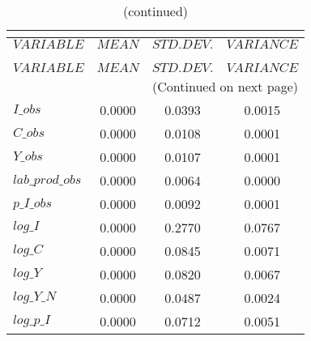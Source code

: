  
\begin{center}
\begin{longtable}{lccc} 
\caption{THEORETICAL MOMENTS}\\
 \label{Table:th_moments}\\
\toprule 
$VARIABLE        $	 & 	 $         MEAN$	 & 	 $    STD. DEV.$	 & 	 $     VARIANCE$\\
\midrule \endfirsthead 
\caption{(continued)}\\
 \toprule \\ 
$VARIABLE        $	 & 	 $         MEAN$	 & 	 $    STD. DEV.$	 & 	 $     VARIANCE$\\
\midrule \endhead 
\midrule \multicolumn{4}{r}{(Continued on next page)} \\ \bottomrule \endfoot 
\bottomrule \endlastfoot 
$I\_obs          $	 & 	       0.0000	 & 	       0.0393	 & 	       0.0015 \\ 
$C\_obs          $	 & 	       0.0000	 & 	       0.0108	 & 	       0.0001 \\ 
$Y\_obs          $	 & 	       0.0000	 & 	       0.0107	 & 	       0.0001 \\ 
$lab\_prod\_obs  $	 & 	       0.0000	 & 	       0.0064	 & 	       0.0000 \\ 
$p\_I\_obs       $	 & 	       0.0000	 & 	       0.0092	 & 	       0.0001 \\ 
$log\_I          $	 & 	       0.0000	 & 	       0.2770	 & 	       0.0767 \\ 
$log\_C          $	 & 	       0.0000	 & 	       0.0845	 & 	       0.0071 \\ 
$log\_Y          $	 & 	       0.0000	 & 	       0.0820	 & 	       0.0067 \\ 
$log\_Y\_N       $	 & 	       0.0000	 & 	       0.0487	 & 	       0.0024 \\ 
$log\_p\_I       $	 & 	       0.0000	 & 	       0.0712	 & 	       0.0051 \\ 
\end{longtable}
 \end{center}
